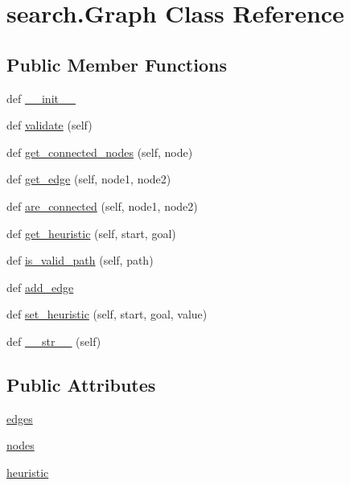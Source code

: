 \hypertarget{classsearch_1_1_graph}{}\section{search.\+Graph Class Reference}
\label{classsearch_1_1_graph}
\subsection*{Public Member Functions}
\begin{DoxyCompactItemize}
\item 
def \hyperlink{classsearch_1_1_graph_afef21a4b359fa1fedeaaa1be2390fc6a}{\+\_\+\+\_\+init\+\_\+\+\_\+}
\item 
def \hyperlink{classsearch_1_1_graph_a2efb3ddbccf9a33f94ee9e39c014b9cf}{validate} (self)
\item 
def \hyperlink{classsearch_1_1_graph_a313519052e9ca4ea9eaeac73c667cdd3}{get\+\_\+connected\+\_\+nodes} (self, node)
\item 
def \hyperlink{classsearch_1_1_graph_a54b7a4a5534191fd8c522ea367d74cb9}{get\+\_\+edge} (self, node1, node2)
\item 
def \hyperlink{classsearch_1_1_graph_a9b6a0f8337eb54f7b53d67417fc23afb}{are\+\_\+connected} (self, node1, node2)
\item 
def \hyperlink{classsearch_1_1_graph_ad102fa6ebd1f67e689e528da7efda373}{get\+\_\+heuristic} (self, start, goal)
\item 
def \hyperlink{classsearch_1_1_graph_a0f4cd5e8659abada444c798f34911d86}{is\+\_\+valid\+\_\+path} (self, path)
\item 
def \hyperlink{classsearch_1_1_graph_a03466aa960a76803956bb1115bd76bf8}{add\+\_\+edge}
\item 
def \hyperlink{classsearch_1_1_graph_a498ce69294a6a3fa1f9f264601614449}{set\+\_\+heuristic} (self, start, goal, value)
\item 
def \hyperlink{classsearch_1_1_graph_a070e1995a35ff1c7c07ea02af800662a}{\+\_\+\+\_\+str\+\_\+\+\_\+} (self)
\end{DoxyCompactItemize}
\subsection*{Public Attributes}
\begin{DoxyCompactItemize}
\item 
\hyperlink{classsearch_1_1_graph_a2e29e81f7794d05b195570d80c23c106}{edges}
\item 
\hyperlink{classsearch_1_1_graph_ad9dc0fcd37b25bf52be08712fa073c1d}{nodes}
\item 
\hyperlink{classsearch_1_1_graph_a0fd1667ac41582d336fbe478bbcad079}{heuristic}
\end{DoxyCompactItemize}



